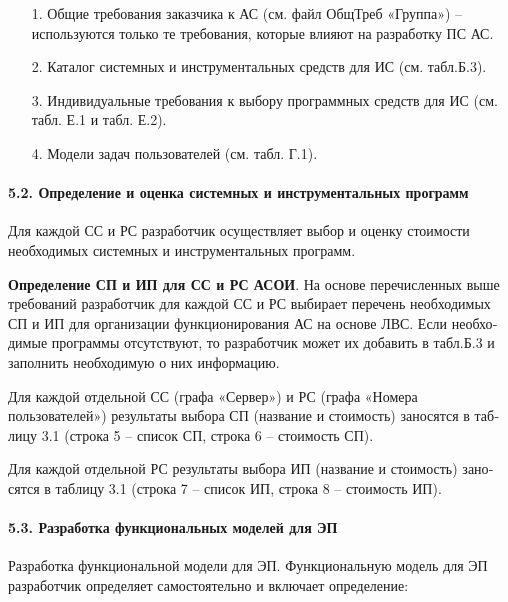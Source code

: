 \documentclass[12pt, a4paper, simple]{eskdtext}
\begin{document}
    \begin{enumerate}
        \item[1.] Общие требования заказчика к АС (см. файл ОбщТреб «Группа») – используются только те требова­ния,
        которые влияют на разработку ПС АС.
        \item[2.] Каталог системных и инструментальных средств для ИС (см. табл.Б.3).
        \item[3.] Индивидуальные требования к выбору программных средств для ИС (см. табл. Е.1 и табл. Е.2).
        \item[4.] Модели задач пользователей (см. табл. Г.1).
    \end{enumerate}

    \newpage
    \paragraph{5.2. Определение и оценка системных и инструментальных программ} \hspace{0pt}  
    
    Для каждой СС и РС разработчик осуществляет выбор и оценку стоимости необходимых системных и инструментальных программ.
    
    \textbf{Определение СП и ИП для СС и РС АСОИ}. На основе перечисленных выше требований разработчик для каждой СС и РС выбирает перечень необ­ходи­мых СП и ИП для организации функционирования АС на основе ЛВС. Если не­обхо­димые программы отсутст­вуют, то разработчик может их добавить в табл.Б.3 и за­полнить необходимую о них ин­формацию.  
    
    Для каждой отдельной СС (графа «Сервер») и РС (графа «Номера пользователей») ре­зультаты выбора СП (название и стоимость)
    заносятся в таб­лицу 3.1 (строка 5 – список СП, строка 6 – стои­мость СП).    
    
    Для каждой отдельной РС ре­зультаты выбора ИП (название и стоимость) зано­сятся в таб­лицу 3.1
    (строка 7 – список ИП, строка 8 – стои­мость ИП).  
    
    \paragraph{5.3. Разработка функциональных моделей для ЭП} \hspace{0pt}
    
    Разработка функциональной модели для ЭП. Функциональную модель для ЭП разработчик опреде­ляет самостоятельно и включает определение:
        
\end{document}
